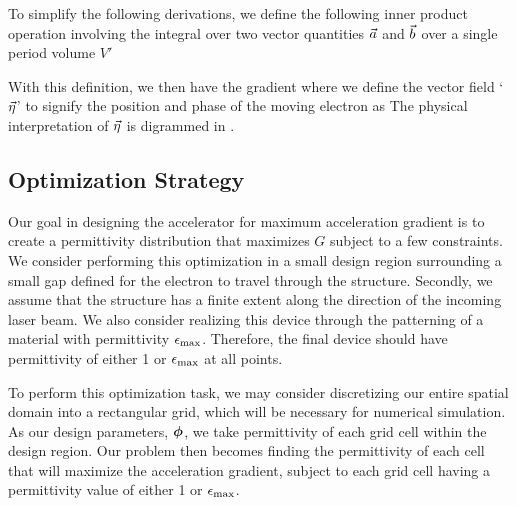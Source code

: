 To simplify the following derivations, we define the following inner product operation involving the integral over two vector quantities $\vec{a}$ and $\vec{b}$ over a single period volume $V'$
%

With this definition, we then have the gradient
%
%
where we define the vector field `$\vec{\eta}$' to signify the position and phase of the moving electron as
The physical interpretation of $\vec{\eta}$ is digrammed in .


\subsection{Optimization Strategy}

Our goal in designing the accelerator for maximum acceleration gradient is to create a permittivity distribution that maximizes $G$ subject to a few constraints.
We consider performing this optimization in a small design region surrounding a small gap defined for the electron to travel through the structure.
Secondly, we assume that the structure has a finite extent along the direction of the incoming laser beam.
We also consider realizing this device through the patterning of a material with permittivity $\epsilon_\textrm{max}$.
Therefore, the final device should have permittivity of either 1 or $\epsilon_\textrm{max}$ at all points.

To perform this optimization task, we may consider discretizing our entire spatial domain into a rectangular grid, which will be necessary for numerical simulation.
As our design parameters, $\bm{\phi}$, we take permittivity of each grid cell within the design region.
Our problem then becomes finding the permittivity of each cell that will maximize the acceleration gradient, subject to each grid cell having a permittivity value of either 1 or $\epsilon_\textrm{max}$.

